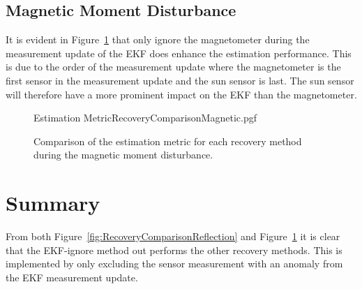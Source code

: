\subsection{Magnetic Moment Disturbance}
It is evident in Figure~\ref{fig:RecoveryComparisonMagnetic} that only ignore the magnetometer during the measurement update of the EKF does enhance the estimation performance. This is due to the order of the measurement update where the magnetometer is the first sensor in the measurement update and the sun sensor is last. The sun sensor will therefore have a more prominent impact on the EKF than the magnetometer.
\begin{figure}[!htb]
	\centering
	\def\pgfwidth{7cm}
	{Estimation MetricRecoveryComparisonMagnetic.pgf}
	
	\caption{Comparison of the estimation metric for each recovery method during the magnetic moment disturbance.}
	\label{fig:RecoveryComparisonMagnetic}
\end{figure}

\section{Summary}
From both Figure~\ref{fig:RecoveryComparisonReflection} and Figure~\ref{fig:RecoveryComparisonMagnetic} it is clear that the EKF-ignore method out performs the other recovery methods. This is implemented by only excluding the sensor measurement with an anomaly from the EKF measurement update.